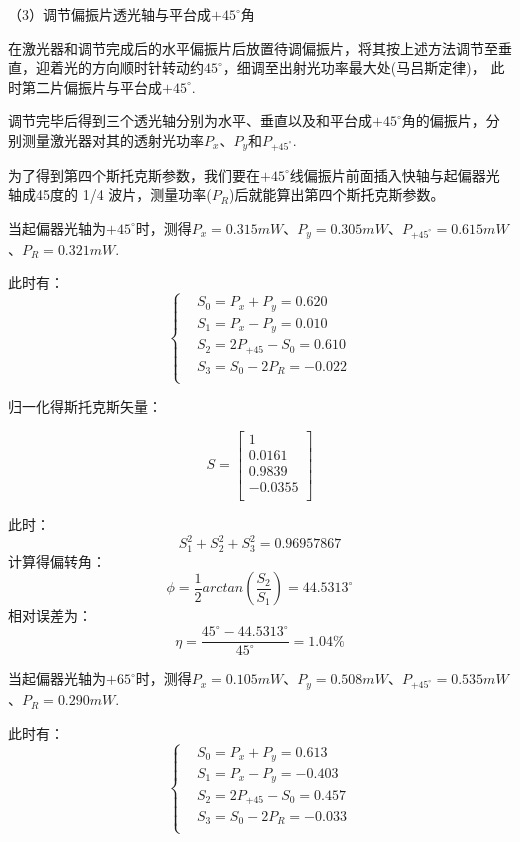 \documentclass[10pt,a4paper,twoside,UTF8]{ctexart}
\begin{document}
（3）调节偏振片透光轴与平台成$+45^{\circ}$角

在激光器和调节完成后的水平偏振片后放置待调偏振片，将其按上述方法调节至垂直，迎着光的方向顺时针转动约$45^{\circ}$，细调至出射光功率最大处(马吕斯定律)，
此时第二片偏振片与平台成$+45^{\circ}$.


调节完毕后得到三个透光轴分别为水平、垂直以及和平台成$+45^{\circ}$角的偏振片，分别测量激光器对其的透射光功率$P_x$、$P_y$和$P_{+45^{\circ}}$.

为了得到第四个斯托克斯参数，我们要在$+45^{\circ}$线偏振片前面插入快轴与起偏器光轴成45度的
 1/4 波片，测量功率($P_R$)后就能算出第四个斯托克斯参数。


当起偏器光轴为$+45^{\circ}$时，测得$P_x=0.315mW$、$P_y=0.305mW$、$P_{+45^{\circ}}=0.615mW$、$P_R=0.321mW$.

此时有：
\[\left\{
\begin{aligned}
&S_0=P_x+P_y=0.620\\
&S_1=P_x-P_y=0.010\\
&S_2=2P_{+45}-S_0=0.610\\
&S_3=S_0-2P_R=-0.022\\
\end{aligned}
\right.
\]

归一化得斯托克斯矢量：

\begin{equation}
	S=
	\left[ 
		\begin{array}{c}
		1\\
		0.0161\\
		0.9839\\
		-0.0355\\
		\end{array} 
	\right ]
\end{equation}

此时：
\begin{equation*}
	S_1^2+S_2^2+S_3^2=0.96957867
\end{equation*}
计算得偏转角：
\begin{equation*}
	\phi=\frac{1}{2}arctan\left(\frac{S_2}{S_1}\right)=44.5313^{\circ}
\end{equation*}
相对误差为：
\begin{equation*}
	\eta=\frac{45^{\circ}-44.5313^{\circ}}{45^{\circ}}=1.04\%
\end{equation*}

当起偏器光轴为$+65^{\circ}$时，测得$P_x=0.105mW$、$P_y=0.508mW$、$P_{+45^{\circ}}=0.535mW$、$P_R=0.290mW$.

此时有：
\[\left\{
\begin{aligned}
&S_0=P_x+P_y=0.613\\
&S_1=P_x-P_y=-0.403\\
&S_2=2P_{+45}-S_0=0.457\\
&S_3=S_0-2P_R=-0.033\\
\end{aligned}
\right.
\]
\end{document}
